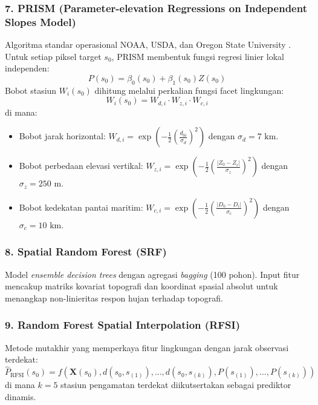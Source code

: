 \documentclass[11pt,a4paper]{article}
\begin{document}
\subsubsection{7. PRISM (Parameter-elevation Regressions on Independent Slopes Model)}
Algoritma standar operasional NOAA, USDA, dan Oregon State University \cite{daly2008physiographically}. Untuk setiap piksel target $s_0$, PRISM membentuk fungsi regresi linier lokal independen:
\begin{equation}
    P(s_0) = \beta_0(s_0) + \beta_1(s_0) Z(s_0)
\end{equation}
Bobot stasiun $W_i(s_0)$ dihitung melalui perkalian fungsi facet lingkungan:
\begin{equation}
    W_i(s_0) = W_{d, i} \cdot W_{z, i} \cdot W_{c, i}
\end{equation}
di mana:
\begin{itemize}
    \item Bobot jarak horizontal: $W_{d, i} = \exp\left( -\frac{1}{2} \left(\frac{d_{0i}}{\sigma_d}\right)^2 \right)$ dengan $\sigma_d = 7\text{ km}$.
    \item Bobot perbedaan elevasi vertikal: $W_{z, i} = \exp\left( -\frac{1}{2} \left(\frac{|Z_0 - Z_i|}{\sigma_z}\right)^2 \right)$ dengan $\sigma_z = 250\text{ m}$.
    \item Bobot kedekatan pantai maritim: $W_{c, i} = \exp\left( -\frac{1}{2} \left(\frac{|D_0 - D_i|}{\sigma_c}\right)^2 \right)$ dengan $\sigma_c = 10\text{ km}$.
\end{itemize}

\subsubsection{8. Spatial Random Forest (SRF)}
Model \textit{ensemble decision trees} dengan agregasi \textit{bagging} (100 pohon). Input fitur mencakup matriks kovariat topografi dan koordinat spasial absolut untuk menangkap non-linieritas respon hujan terhadap topografi.

\subsubsection{9. Random Forest Spatial Interpolation (RFSI)}
Metode mutakhir \cite{hengl2018random} yang memperkaya fitur lingkungan dengan jarak observasi terdekat:
\begin{equation}
    \hat{P}_{\text{RFSI}}(s_0) = f\left( \mathbf{X}(s_0), d(s_0, s_{(1)}), \dots, d(s_0, s_{(k)}), P(s_{(1)}), \dots, P(s_{(k)}) \right)
\end{equation}
di mana $k = 5$ stasiun pengamatan terdekat diikutsertakan sebagai prediktor dinamis.
\end{document}
